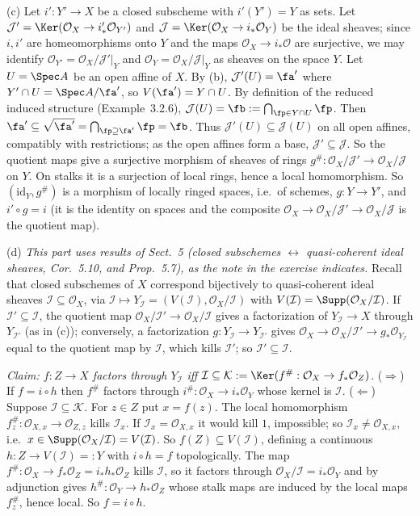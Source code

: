 \documentclass[11pt]{article}
\begin{document}
(c) Let $i':Y'\to X$ be a closed subscheme with $i'(Y')=Y$ as sets. Let $\mathcal J'=\Ker(\mathcal O_X\to i'_*\mathcal O_{Y'})$ and $\mathcal J=\Ker(\mathcal O_X\to i_*\mathcal O_Y)$ be the ideal sheaves; since $i,i'$ are homeomorphisms onto $Y$ and the maps $\mathcal O_X\to i_*\mathcal O$ are surjective, we may identify $\mathcal O_{Y'}=\mathcal O_X/\mathcal J'|_Y$ and $\mathcal O_Y=\mathcal O_X/\mathcal J|_Y$ as sheaves on the space $Y$. Let $U=\Spec A$ be an open affine of $X$. By (b), $\mathcal J'(U)=\fa'$ where $Y'\cap U=\Spec A/\fa'$, so $V(\fa')=Y\cap U$. By definition of the reduced induced structure (Example~3.2.6), $\mathcal J(U)=\fb:=\bigcap_{\fp\in Y\cap U}\fp$. Then $\fa'\subseteq\sqrt{\fa'}=\bigcap_{\fp\supseteq\fa'}\fp=\fb$. Thus $\mathcal J'(U)\subseteq\mathcal J(U)$ on all open affines, compatibly with restrictions; as the open affines form a base, $\mathcal J'\subseteq\mathcal J$. So the quotient maps give a surjective morphism of sheaves of rings $g^\#:\mathcal O_X/\mathcal J'\to\mathcal O_X/\mathcal J$ on $Y$. On stalks it is a surjection of local rings, hence a local homomorphism. So $(\mathrm{id}_Y,g^\#)$ is a morphism of locally ringed spaces, i.e.\ of schemes, $g:Y\to Y'$, and $i'\circ g=i$ (it is the identity on spaces and the composite $\mathcal O_X\to\mathcal O_X/\mathcal J'\to\mathcal O_X/\mathcal J$ is the quotient map).

(d) \emph{This part uses results of Sect.~5 (closed subschemes $\leftrightarrow$ quasi-coherent ideal sheaves, Cor.~5.10, and Prop.~5.7), as the note in the exercise indicates.} Recall that closed subschemes of $X$ correspond bijectively to quasi-coherent ideal sheaves $\mathcal I\subseteq\mathcal O_X$, via $\mathcal I\mapsto Y_{\mathcal I}=(V(\mathcal I),\mathcal O_X/\mathcal I)$ with $V(\mathcal I)=\Supp(\mathcal O_X/\mathcal I)$. If $\mathcal I'\subseteq\mathcal I$, the quotient map $\mathcal O_X/\mathcal I'\to\mathcal O_X/\mathcal I$ gives a factorization of $Y_{\mathcal I}\to X$ through $Y_{\mathcal I'}$ (as in (c)); conversely, a factorization $g:Y_{\mathcal I}\to Y_{\mathcal I'}$ gives $\mathcal O_X\to\mathcal O_X/\mathcal I'\to g_*\mathcal O_{Y_{\mathcal I}}$ equal to the quotient map by $\mathcal I$, which kills $\mathcal I'$; so $\mathcal I'\subseteq\mathcal I$.

\emph{Claim: $f:Z\to X$ factors through $Y_{\mathcal I}$ iff $\mathcal I\subseteq\mathcal K:=\Ker(f^\#:\mathcal O_X\to f_*\mathcal O_Z)$.} ($\Rightarrow$) If $f=i\circ h$ then $f^\#$ factors through $i^\#:\mathcal O_X\to i_*\mathcal O_{Y}$ whose kernel is $\mathcal I$. ($\Leftarrow$) Suppose $\mathcal I\subseteq\mathcal K$. For $z\in Z$ put $x=f(z)$. The local homomorphism $f^\#_z:\mathcal O_{X,x}\to\mathcal O_{Z,z}$ kills $\mathcal I_x$. If $\mathcal I_x=\mathcal O_{X,x}$ it would kill $1$, impossible; so $\mathcal I_x\ne\mathcal O_{X,x}$, i.e.\ $x\in\Supp(\mathcal O_X/\mathcal I)=V(\mathcal I)$. So $f(Z)\subseteq V(\mathcal I)$, defining a continuous $h:Z\to V(\mathcal I)=:Y$ with $i\circ h=f$ topologically. The map $f^\#:\mathcal O_X\to f_*\mathcal O_Z=i_*h_*\mathcal O_Z$ kills $\mathcal I$, so it factors through $\mathcal O_X/\mathcal I=i_*\mathcal O_Y$ and by adjunction gives $h^\#:\mathcal O_Y\to h_*\mathcal O_Z$ whose stalk maps are induced by the local maps $f^\#_z$, hence local. So $f=i\circ h$.
\end{document}
